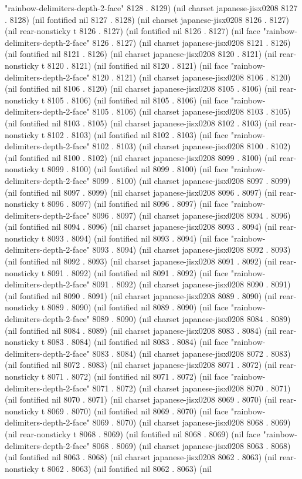 "rainbow-delimiters-depth-2-face" 8128 . 8129) (nil charset japanese-jisx0208 8127 . 8128) (nil fontified nil 8127 . 8128) (nil charset japanese-jisx0208 8126 . 8127) (nil rear-nonsticky t 8126 . 8127) (nil fontified nil 8126 . 8127) (nil face "rainbow-delimiters-depth-2-face" 8126 . 8127) (nil charset japanese-jisx0208 8121 . 8126) (nil fontified nil 8121 . 8126) (nil charset japanese-jisx0208 8120 . 8121) (nil rear-nonsticky t 8120 . 8121) (nil fontified nil 8120 . 8121) (nil face "rainbow-delimiters-depth-2-face" 8120 . 8121) (nil charset japanese-jisx0208 8106 . 8120) (nil fontified nil 8106 . 8120) (nil charset japanese-jisx0208 8105 . 8106) (nil rear-nonsticky t 8105 . 8106) (nil fontified nil 8105 . 8106) (nil face "rainbow-delimiters-depth-2-face" 8105 . 8106) (nil charset japanese-jisx0208 8103 . 8105) (nil fontified nil 8103 . 8105) (nil charset japanese-jisx0208 8102 . 8103) (nil rear-nonsticky t 8102 . 8103) (nil fontified nil 8102 . 8103) (nil face "rainbow-delimiters-depth-2-face" 8102 . 8103) (nil charset japanese-jisx0208 8100 . 8102) (nil fontified nil 8100 . 8102) (nil charset japanese-jisx0208 8099 . 8100) (nil rear-nonsticky t 8099 . 8100) (nil fontified nil 8099 . 8100) (nil face "rainbow-delimiters-depth-2-face" 8099 . 8100) (nil charset japanese-jisx0208 8097 . 8099) (nil fontified nil 8097 . 8099) (nil charset japanese-jisx0208 8096 . 8097) (nil rear-nonsticky t 8096 . 8097) (nil fontified nil 8096 . 8097) (nil face "rainbow-delimiters-depth-2-face" 8096 . 8097) (nil charset japanese-jisx0208 8094 . 8096) (nil fontified nil 8094 . 8096) (nil charset japanese-jisx0208 8093 . 8094) (nil rear-nonsticky t 8093 . 8094) (nil fontified nil 8093 . 8094) (nil face "rainbow-delimiters-depth-2-face" 8093 . 8094) (nil charset japanese-jisx0208 8092 . 8093) (nil fontified nil 8092 . 8093) (nil charset japanese-jisx0208 8091 . 8092) (nil rear-nonsticky t 8091 . 8092) (nil fontified nil 8091 . 8092) (nil face "rainbow-delimiters-depth-2-face" 8091 . 8092) (nil charset japanese-jisx0208 8090 . 8091) (nil fontified nil 8090 . 8091) (nil charset japanese-jisx0208 8089 . 8090) (nil rear-nonsticky t 8089 . 8090) (nil fontified nil 8089 . 8090) (nil face "rainbow-delimiters-depth-2-face" 8089 . 8090) (nil charset japanese-jisx0208 8084 . 8089) (nil fontified nil 8084 . 8089) (nil charset japanese-jisx0208 8083 . 8084) (nil rear-nonsticky t 8083 . 8084) (nil fontified nil 8083 . 8084) (nil face "rainbow-delimiters-depth-2-face" 8083 . 8084) (nil charset japanese-jisx0208 8072 . 8083) (nil fontified nil 8072 . 8083) (nil charset japanese-jisx0208 8071 . 8072) (nil rear-nonsticky t 8071 . 8072) (nil fontified nil 8071 . 8072) (nil face "rainbow-delimiters-depth-2-face" 8071 . 8072) (nil charset japanese-jisx0208 8070 . 8071) (nil fontified nil 8070 . 8071) (nil charset japanese-jisx0208 8069 . 8070) (nil rear-nonsticky t 8069 . 8070) (nil fontified nil 8069 . 8070) (nil face "rainbow-delimiters-depth-2-face" 8069 . 8070) (nil charset japanese-jisx0208 8068 . 8069) (nil rear-nonsticky t 8068 . 8069) (nil fontified nil 8068 . 8069) (nil face "rainbow-delimiters-depth-2-face" 8068 . 8069) (nil charset japanese-jisx0208 8063 . 8068) (nil fontified nil 8063 . 8068) (nil charset japanese-jisx0208 8062 . 8063) (nil rear-nonsticky t 8062 . 8063) (nil fontified nil 8062 . 8063) (nil 